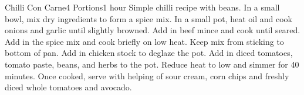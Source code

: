 \begin{recipe}[ChilliConCarne]{Chilli Con Carne}{4 Portions}{1 hour}
    \freeform Simple chilli recipe with beans.
    In a small bowl, mix dry ingredients to form a spice mix.
    In a small pot, heat oil and cook onions and garlic until slightly browned.
    Add in beef mince and cook until seared. Add in the spice mix and cook briefly on low heat. Keep mix from sticking to bottom of pan.
    Add in chicken stock to deglaze the pot.
    Add in diced tomatoes, tomato paste, beans, and herbs to the pot. Reduce heat to low and simmer for 40 minutes.
    Once cooked, serve with helping of sour cream, corn chips and freshly diced whole tomatoes and avocado.
    \freeform\hrulefill
\end{recipe}